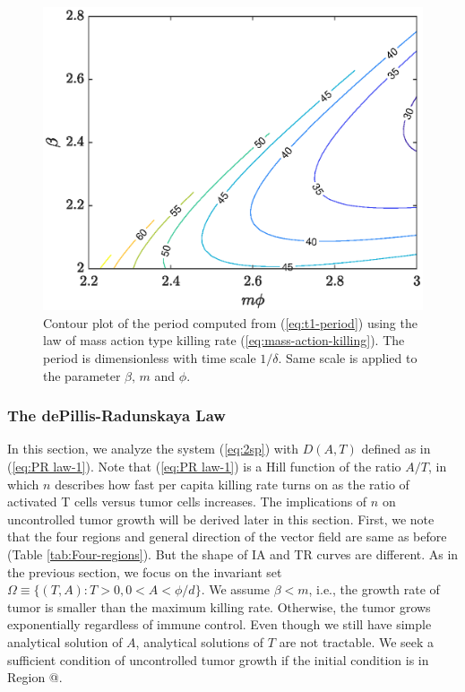 \documentclass[review,authoryear]{elsarticle}
\makeatletter
\newcommand*{\rom}[1]{\expandafter\@slowromancap\romannumeral #1@}
\makeatother
\begin{document}
\begin{figure}
\centering
\includegraphics[width=0.8\linewidth]{figs/DA-period-contour2}
\caption{\label{fig:Contour-plot-of-period}Contour plot of the period computed
from (\ref{eq:t1-period}) using the law of mass action type killing rate (\ref{eq:mass-action-killing}). The period is dimensionless with time scale $1/ \delta$. Same scale is applied to the parameter $\beta,\,m$ and $\phi$. }
\end{figure}


\subsubsection{The dePillis-Radunskaya Law}
In this section, we analyze the system (\ref{eq:2sp}) with $D(A,T)$
defined as in  (\ref{eq:PR law-1}). Note that (\ref{eq:PR law-1}) is a Hill
function of the ratio $A/T$, in which $n$ describes how fast per capita
killing rate turns on as the ratio of activated T cells versus tumor cells increases.
The implications of $n$ on uncontrolled tumor growth will be derived later in this section.
First, we note that the four regions and general direction of the vector field are same as before (Table \ref{tab:Four-regions}). But the shape of IA and TR curves are different. As in the previous section, we focus on the
invariant set $\Omega \equiv \{(T,A):T>0,0<A<\phi/d\}$. We assume $\beta<m$, i.e.,
the growth rate of tumor is smaller than the maximum killing rate.
Otherwise, the tumor grows exponentially regardless of immune control.
Even though we still have simple analytical solution of $A$, analytical
solutions of $T$ are not tractable. We seek a sufficient condition
of uncontrolled tumor growth if the initial condition is in Region \rom{2}. 
\end{document}
